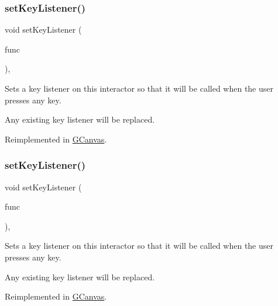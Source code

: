 \subsubsection{\texorpdfstring{set\+Key\+Listener()}{setKeyListener()}\hspace{0.1cm}{\footnotesize\ttfamily [1/2]}}
{\footnotesize\ttfamily void set\+Key\+Listener (\begin{DoxyParamCaption}\item[{G\+Event\+Listener}]{func }\end{DoxyParamCaption})\hspace{0.3cm}{\ttfamily [virtual]}, {\ttfamily [inherited]}}



Sets a key listener on this interactor so that it will be called when the user presses any key. 

Any existing key listener will be replaced. 

Reimplemented in \mbox{\hyperlink{classGCanvas_a53809ec015da5bf9fad5e7a11b218993}{G\+Canvas}}.

\mbox{\label{classGInteractor_ae48ecea73606c7bd9423e1c7cc589cc9}} 
\subsubsection{\texorpdfstring{set\+Key\+Listener()}{setKeyListener()}\hspace{0.1cm}{\footnotesize\ttfamily [2/2]}}
{\footnotesize\ttfamily void set\+Key\+Listener (\begin{DoxyParamCaption}\item[{G\+Event\+Listener\+Void}]{func }\end{DoxyParamCaption})\hspace{0.3cm}{\ttfamily [virtual]}, {\ttfamily [inherited]}}



Sets a key listener on this interactor so that it will be called when the user presses any key. 

Any existing key listener will be replaced. 

Reimplemented in \mbox{\hyperlink{classGCanvas_a1320ed9889a730dfead04a334463ecf3}{G\+Canvas}}.

\mbox{\label{classGBrowserPane_aaaafb06fec060b28b70ec3b7379657b4}} 
